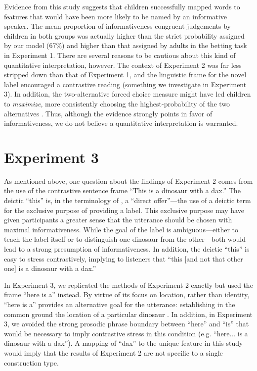 \documentclass[man,noapacite]{apa2}
\begin{document}
Evidence from this study suggests that children successfully mapped words to features that would have been more likely to be named by an informative speaker. The mean proportion of informativeness-congruent judgements by children in both groups was actually higher than the strict probability assigned by our model (67\%) and higher than that assigned by adults in the betting task in Experiment 1. There are several reasons to be cautious about this kind of quantitative interpretation, however. The context of Experiment 2 was far less stripped down than that of Experiment 1, and the linguistic frame for the novel label encouraged a contrastive reading (something we investigate in Experiment 3). In addition, the two-alternative forced choice measure might have led children to \emph{maximize}, more consistently choosing the highest-probability of the two alternatives  \cite{hudsonkam2005}. Thus, although the evidence strongly points in favor of informativeness, we do not believe a quantitative interpretation is warranted.




\section{Experiment 3}

As mentioned above, one question about the findings of Experiment 2 comes from the use of the contrastive sentence frame ``This is a dinosaur with a dax.'' The deictic ``this'' is, in the terminology of , a ``direct offer''---the use of a deictic term for the exclusive purpose of providing a label. This exclusive purpose may have given participants a greater sense that the utterance should be chosen with maximal informativeness. While the goal of the label is ambiguous---either to teach the label itself or to distinguish one dinosaur from the other---both would lead to a strong presumption of informativeness. In addition, the deictic ``this'' is easy to stress contrastively, implying to listeners that ``this [and not that other one] is a dinosaur with a dax.'' 

In Experiment 3, we replicated the methods of Experiment 2 exactly but used the frame ``here is a'' instead. By virtue of its focus on location, rather than identity, ``here is a'' provides an alternative goal for the utterance: establishing in the common ground the location of a particular dinosaur \cite{clark1996}.  In addition, in Experiment 3, we avoided the strong prosodic phrase boundary between ``here'' and ``is'' that would be necessary to imply contrastive stress in this condition (e.g. ``here... is a dinosaur with a dax''). A mapping of ``dax'' to the unique feature in this study would imply that the results of Experiment 2 are not specific to a single construction type. 
\end{document}
